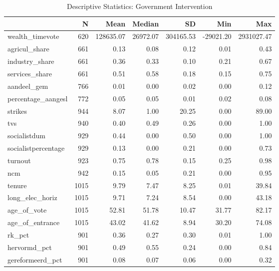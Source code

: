 \begin{table}[!h]

\caption{\label{tab:descriptives_govtintervention}Descriptive Statistics: Government Intervention}
\centering
\fontsize{9}{11}\selectfont
\begin{tabular}[t]{lrrrrrr}
\toprule
  & N & Mean & Median & SD & Min & Max\\
\midrule
wealth\_timevote & 620 & 128635.07 & 26972.07 & 304165.53 & -29021.20 & 2931027.47\\
agricul\_share & 661 & 0.13 & 0.08 & 0.12 & 0.01 & 0.43\\
industry\_share & 661 & 0.36 & 0.33 & 0.10 & 0.21 & 0.67\\
services\_share & 661 & 0.51 & 0.58 & 0.18 & 0.15 & 0.75\\
aandeel\_gem & 766 & 0.01 & 0.00 & 0.02 & 0.00 & 0.12\\
percentage\_aangesl & 772 & 0.05 & 0.05 & 0.01 & 0.02 & 0.08\\
strikes & 944 & 8.07 & 1.00 & 20.25 & 0.00 & 89.00\\
tvs & 940 & 0.40 & 0.49 & 0.26 & 0.00 & 1.00\\
socialistdum & 929 & 0.44 & 0.00 & 0.50 & 0.00 & 1.00\\
socialistpercentage & 929 & 0.13 & 0.00 & 0.21 & 0.00 & 0.73\\
turnout & 923 & 0.75 & 0.78 & 0.15 & 0.25 & 0.98\\
ncm & 942 & 0.15 & 0.05 & 0.21 & 0.00 & 0.95\\
tenure & 1015 & 9.79 & 7.47 & 8.25 & 0.01 & 39.84\\
long\_elec\_horiz & 1015 & 9.71 & 7.24 & 8.54 & 0.00 & 43.18\\
age\_of\_vote & 1015 & 52.81 & 51.78 & 10.47 & 31.77 & 82.17\\
age\_of\_entrance & 1015 & 43.02 & 41.62 & 8.94 & 30.20 & 74.08\\
rk\_pct & 901 & 0.36 & 0.27 & 0.30 & 0.01 & 1.00\\
hervormd\_pct & 901 & 0.49 & 0.55 & 0.24 & 0.00 & 0.84\\
gereformeerd\_pct & 901 & 0.08 & 0.07 & 0.06 & 0.00 & 0.32\\
\bottomrule
\end{tabular}
\end{table}